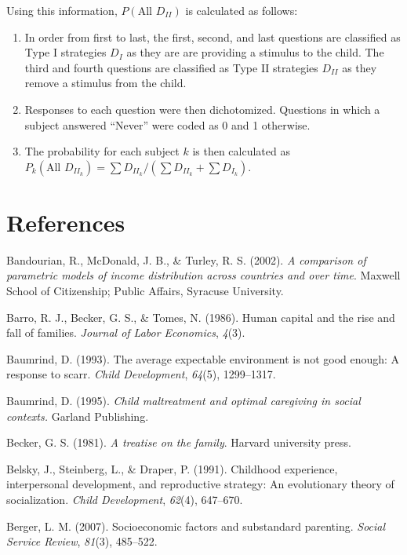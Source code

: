 \documentclass[review]{elsarticle}\usepackage[]{graphicx}\usepackage[]{color}
\begin{document}
Using this information, $P(\text{All } D_{II})$ is calculated as
follows:

\begin{enumerate}
\def\labelenumi{\arabic{enumi}.}
\itemsep1pt\parskip0pt
\item
  In order from first to last, the first, second, and last questions are
  classified as Type I strategies $D_I$ as they are are providing a
  stimulus to the child. The third and fourth questions are classified
  as Type II strategies $D_{II}$ as they remove a stimulus from the
  child.
\item
  Responses to each question were then dichotomized. Questions in which
  a subject answered ``Never'' were coded as 0 and 1 otherwise.
\item
  The probability for each subject $k$ is then calculated as\\
  $P_k(\text{All }D_{II_k})=\sum{D_{II_k}}/(\sum{D_{II_k}}+\sum{D_{I_k}})$.
\end{enumerate}


\section{References}\label{references}

Bandourian, R., McDonald, J. B., \& Turley, R. S. (2002). \emph{A
comparison of parametric models of income distribution across countries
and over time}. Maxwell School of Citizenship; Public Affairs, Syracuse
University.

Barro, R. J., Becker, G. S., \& Tomes, N. (1986). Human capital and the
rise and fall of families. \emph{Journal of Labor Economics},
\emph{4}(3).

Baumrind, D. (1993). The average expectable environment is not good
enough: A response to scarr. \emph{Child Development}, \emph{64}(5),
1299--1317.

Baumrind, D. (1995). \emph{Child maltreatment and optimal caregiving in
social contexts.} Garland Publishing.

Becker, G. S. (1981). \emph{A treatise on the family}. Harvard
university press.

Belsky, J., Steinberg, L., \& Draper, P. (1991). Childhood experience,
interpersonal development, and reproductive strategy: An evolutionary
theory of socialization. \emph{Child Development}, \emph{62}(4),
647--670.

Berger, L. M. (2007). Socioeconomic factors and substandard parenting.
\emph{Social Service Review}, \emph{81}(3), 485--522.
\end{document}
